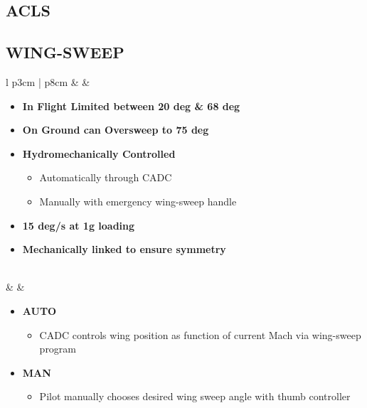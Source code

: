 \documentclass[8pt,usenames,dvipsnames,twoside]{article}
\begin{document}
		\subsection{ACLS}
	
		\subsection{WING-SWEEP}
		\begin{center}
			\begin{longtable}{l p{3cm} | p{8cm}}
				\toprule
				\textbullet &  & 
				\begin{minipage}[t]{\linewidth}
					\vspace{-7pt}
					\begin{itemize}
						\item \textbf{In Flight Limited between 20 deg \& 68 deg}
						\item \textbf{On Ground can Oversweep to 75 deg}
						\item \textbf{Hydromechanically Controlled}
						\begin{itemize}
							\item Automatically through CADC
							\item Manually with emergency wing-sweep handle
						\end{itemize}
						\item \textbf{15 deg/s at 1g loading}
						\item \textbf{Mechanically linked to ensure symmetry}
					\end{itemize}
				\end{minipage} \\
				\midrule
				\textbullet &  & 
				\begin{minipage}[t]{\linewidth}
					\vspace{-7pt}
					\begin{itemize}
						\item \textbf{AUTO}
						\begin{itemize}
							\item CADC controls wing position as function of current Mach via wing-sweep program
						\end{itemize}
						\item \textbf{MAN}
						\begin{itemize}
							\item Pilot manually chooses desired wing sweep angle with thumb controller
						\end{itemize}

\end{itemize}
\end{minipage}
\end{longtable}
\end{center}
\end{document}
